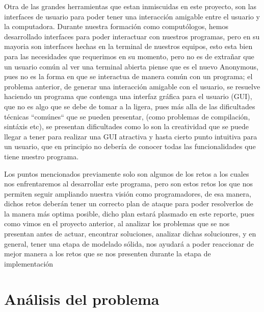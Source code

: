 \documentclass[10pt,letterpaper]{report}
\begin{document}
\noindent Otra de las grandes herramientas que estan inmiscuidas en este proyecto, son las interfaces de usuario para poder tener una interacción amigable entre el usuario y la computadora. Durante nuestra formación como computólogos, hemos desarrollado interfaces para poder interactuar con nuestros programas, pero en su mayoria son interfaces hechas en la terminal de nuestros equipos, esto esta bien para las necesidades que requerimos en su momento, pero no es de extrañar que un usuario común al ver una terminal abierta piense que es el nuevo Anonymous, pues no es la forma en que se interactua de manera común con un programa; el problema anterior, de generar una interacción amigable con el usuario, se resuelve haciendo un programa que contenga una interfaz gráfica para el usuario (GUI), que no es algo que se debe de tomar a la ligera, pues más alla de las dificultades técnicas ``comúnes`` que se pueden presentar, (como problemas de compilación, sintáxis etc), se presentan dificultades como lo son la creatividad que se puede llegar a tener para realizar una GUI atractiva y hasta cierto punto intuitiva para un usuario, que en principio no debería de conocer todas las funcionalidades que tiene nuestro programa.
\vspace{0.2cm}

\vspace{0.2 cm}

\noindent Los puntos mencionados previamente solo son algunos de los retos a los cuales nos enfrentaremos al desarrollar este programa, pero son estos retos los que nos permiten seguir ampliando nuestra visión como programadores, de esa manera, dichos retos deberán tener un correcto plan de ataque para poder resolverlos de la manera más optima posible, dicho plan estará plasmado en este reporte, pues como vimos en el proyecto anterior, al analizar los problemas que se nos presentan antes de actuar, encontrar soluciones, analizar dichas solucionres, y en general, tener una etapa de modelado sólida, nos ayudará a poder reaccionar de mejor manera a los retos que se nos presenten durante la etapa de implementación

\vspace{0.2cm}




    \chapter{Análisis del problema}
\end{document}
